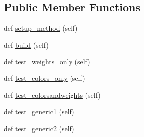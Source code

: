 \subsection*{Public Member Functions}
\begin{DoxyCompactItemize}
\item 
def \hyperlink{classnetworkx_1_1algorithms_1_1isomorphism_1_1tests_1_1test__vf2userfunc_1_1TestEdgeMatch__MultiGraph_a5ffa6c3308626cb796adb47f360f0e18}{setup\+\_\+method} (self)
\item 
def \hyperlink{classnetworkx_1_1algorithms_1_1isomorphism_1_1tests_1_1test__vf2userfunc_1_1TestEdgeMatch__MultiGraph_a046863cfdc308f23efe3fff2d99472d2}{build} (self)
\item 
def \hyperlink{classnetworkx_1_1algorithms_1_1isomorphism_1_1tests_1_1test__vf2userfunc_1_1TestEdgeMatch__MultiGraph_a0570c7800d494b16540269aa9cd3b4d9}{test\+\_\+weights\+\_\+only} (self)
\item 
def \hyperlink{classnetworkx_1_1algorithms_1_1isomorphism_1_1tests_1_1test__vf2userfunc_1_1TestEdgeMatch__MultiGraph_a4a5c818995ce17eae0fe6b7f91381205}{test\+\_\+colors\+\_\+only} (self)
\item 
def \hyperlink{classnetworkx_1_1algorithms_1_1isomorphism_1_1tests_1_1test__vf2userfunc_1_1TestEdgeMatch__MultiGraph_a9b9dc97f48d006680e530c5c17ae5643}{test\+\_\+colorsandweights} (self)
\item 
def \hyperlink{classnetworkx_1_1algorithms_1_1isomorphism_1_1tests_1_1test__vf2userfunc_1_1TestEdgeMatch__MultiGraph_add861084164938a27070d43a759432b9}{test\+\_\+generic1} (self)
\item 
def \hyperlink{classnetworkx_1_1algorithms_1_1isomorphism_1_1tests_1_1test__vf2userfunc_1_1TestEdgeMatch__MultiGraph_aa68cd77ba07bafed0199ae32216a046a}{test\+\_\+generic2} (self)
\end{DoxyCompactItemize}

